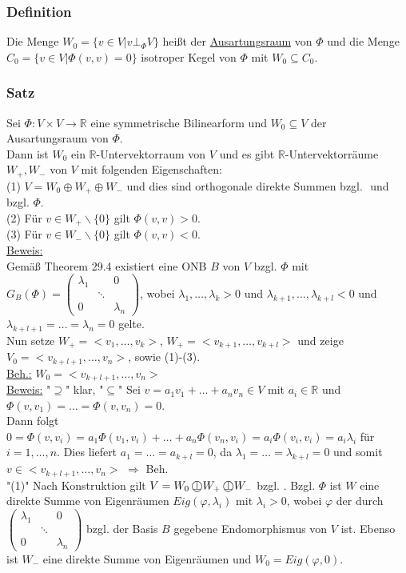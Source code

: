 \documentclass[a4paper]{article}
\newcommand*{\obot}{\perp\mkern-20.7mu\bigcirc}
\newcommand{\ul}{\underline}
\renewcommand{\proof}{\ul{Beweis:}\\}
\let\phi\varphi
\begin{document}
\subsubsection{Definition}
Die Menge \(W_0=\{v\in V|v\bot_\Phi V\}\) heißt der \ul{Ausartungsraum} von \(\Phi\) und die Menge \(C_0=\{v\in V|\Phi(v,v)=0\}\) isotroper Kegel von \(\Phi\) mit \(W_0\subseteq C_0\).
\subsubsection{Satz}
Sei \(\Phi:V\times V\rightarrow \mathbb{R}\) eine symmetrische Bilinearform und \(W_0\subseteq V\) der Ausartungsraum von \(\Phi\).\\
Dann ist \(W_0\) ein \(\mathbb{R}\)-Untervektorraum von \(V\) und es gibt \(\mathbb{R}\)-Untervektorräume \(W_+, W_-\) von \(V\) mit folgenden Eigenschaften:\\
(1) \(V=W_0\oplus W_+ \oplus W_-\) und dies sind orthogonale direkte Summen bzgl. \(<,>\) und bzgl. \(\Phi\).\\
(2) Für \(v\in W_+\backslash\{0\}\) gilt \(\Phi(v,v)>0\).\\
(3) Für \(v\in W_-\backslash\{0\}\) gilt \(\Phi(v,v)<0\).\\
\proof
Gemäß Theorem 29.4 existiert eine ONB \(B\) von \(V\) bzgl. \(\Phi\) mit \(G_B(\Phi)=\begin{pmatrix}
\lambda_1 & & 0\\
& \ddots & \\
0 & & \lambda_n
\end{pmatrix}\), wobei \(\lambda_1,\dots,\lambda_k>0\) und \(\lambda_{k+1},\dots,\lambda_{k+l}<0\) und \(\lambda_{k+l+1}=\dots=\lambda_n=0\) gelte.\\
Nun setze \(W_+=<v_1,\dots,v_k>\), \(W_+=<v_{k+1},\dots,v_{k+l}>\) und zeige \(V_0=<v_{k+l+1},\dots,v_n>\), sowie (1)-(3).\\
\ul{Beh.:} \(W_0=<v_{k+l+1},\dots,v_n>\)\\
\ul{Beweis:} "\(\supseteq\)" klar, "\(\subseteq\)" Sei \(v=a_1v_1+\dots+a_nv_n\in V\) mit \(a_i\in\mathbb{R}\) und \(\Phi(v,v_1)=\dots=\Phi(v,v_n)=0\).\\
Dann folgt \(0=\Phi(v,v_i)=a_1\Phi(v_1,v_i)+\dots+a_n\Phi(v_n,v_i)=a_i\Phi(v_i,v_i)=a_i\lambda_i\) für \(i=1,\dots,n\). Dies liefert \(a_1=\dots=a_{k+l}=0\), da \(\lambda_1=\dots=\lambda_{k+l}=0\) und somit \(v\in<v_{k+l+1},\dots,v_n>\) \(\Rightarrow\) Beh.\\
"(1)" Nach Konstruktion gilt \(V=W_0\obot W_+\obot W_-\) bzgl. \(<,>\). Bzgl. \(\Phi\) ist \(W\) eine direkte Summe von Eigenräumen \(Eig(\phi, \lambda_i)\) mit \(\lambda_i>0\), wobei \(\phi\) der durch \(\begin{pmatrix}
\lambda_1 &  & 0\\
&\ddots&\\
0 & & \lambda_n
\end{pmatrix}\) bzgl. der Basis \(B\) gegebene Endomorphismus von \(V\) ist. Ebenso ist \(W_-\) eine direkte Summe von Eigenräumen und \(W_0=Eig(\phi,0)\).\\
\end{document}
